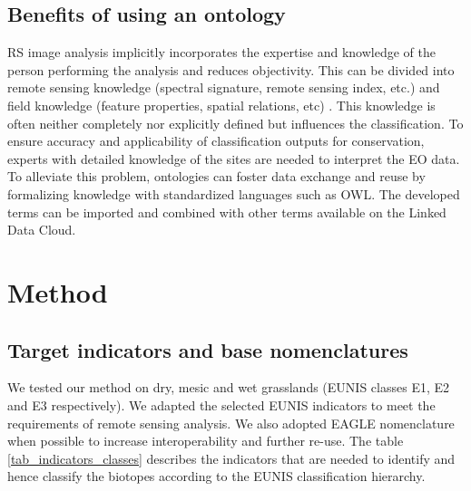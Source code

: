 \documentclass[authoryear, review,12pt,number]{elsarticle}
\begin{document}
\subsection{Benefits of using an ontology}
RS image analysis implicitly incorporates the expertise and
knowledge of the person performing the analysis and reduces objectivity. This
can be divided into remote sensing knowledge (spectral signature, remote
sensing index, etc.) and field knowledge (feature properties, spatial
relations, etc) \citep{Andres2013a}. This knowledge is often neither completely
nor explicitly defined but influences the classification. To ensure accuracy and
applicability of classification outputs for conservation, experts with detailed
knowledge of the sites are needed to interpret the EO data. To alleviate this
problem, ontologies can foster data exchange and reuse by formalizing knowledge
with standardized languages such as OWL. The developed terms can be imported and
combined with other terms available on the Linked Data Cloud. 
\section{Method}
\subsection{Target indicators and base nomenclatures}
We tested our method on dry, mesic and wet grasslands (EUNIS classes E1, E2 and
E3 respectively). 
We adapted the
selected EUNIS indicators to meet the requirements of remote sensing analysis.
We also adopted EAGLE nomenclature when possible to increase interoperability
and further re-use.
The table \ref{tab_indicators_classes} describes the
indicators that are needed to identify and hence classify the biotopes
according to the EUNIS classification hierarchy.
\end{document}
